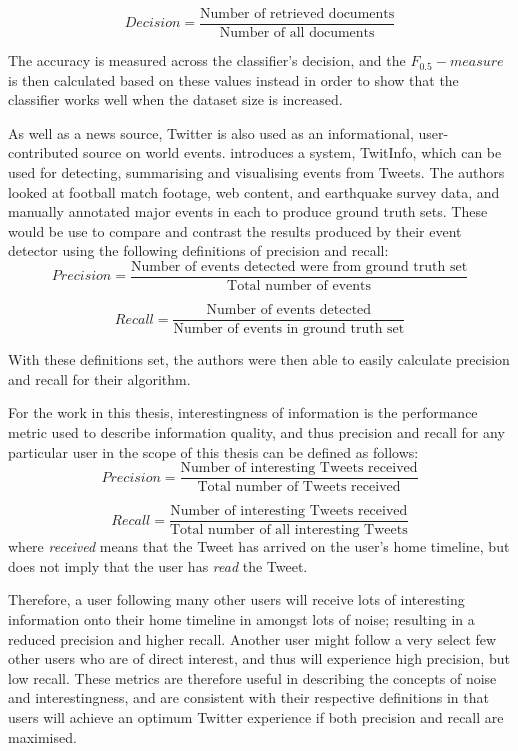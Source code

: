 \[
	Decision = \frac{\text{Number of retrieved documents}}{\text{Number of all documents}}
\]

The accuracy is measured across the classifier's decision, and the $ F_{0.5}-measure $  is then calculated based on these values instead in order to show that the classifier works well when the dataset size is increased.

As well as a news source, Twitter is also used as an informational, user-contributed source on world events. \cite{marcus11}  introduces a system, TwitInfo, which can be used for detecting, summarising and visualising events from Tweets. The authors looked at football match footage, web content, and earthquake survey data, and manually annotated major events in each to produce ground truth sets. These would be use to compare and contrast the results produced by their event detector using the following definitions of precision and recall:
\[	
	Precision = \frac{\text{Number of events detected were from ground truth set}}{\text{Total number of events}}
\]

\[
	Recall = \frac{\text{Number of events detected}}{\text{Number of events in ground truth set}}
\]

With these definitions set, the authors were then able to easily calculate precision and recall for their algorithm.

For the work in this thesis, interestingness of information is the performance metric used to describe information quality, and thus precision and recall for any particular user in the scope of this thesis can be defined as follows:
\[
	Precision = \frac{\text{Number of interesting Tweets received}}{\text{Total number of Tweets received}}
\]

\[
	Recall = \frac{\text{Number of interesting Tweets received}}{\text{Total number of all interesting Tweets}}
\]
where \textit{received} means that the Tweet has arrived on the user's home timeline, but does not imply that the user has \textit{read} the Tweet.

Therefore, a user following many other users will receive lots of interesting information onto their home timeline in amongst lots of noise; resulting in a reduced precision and higher recall. Another user might follow a very select few other users who are of direct interest, and thus will experience high precision, but low recall. These metrics are therefore useful in describing the concepts of noise and interestingness, and are consistent with their respective definitions in that users will achieve an optimum Twitter experience if both precision and recall are maximised.


